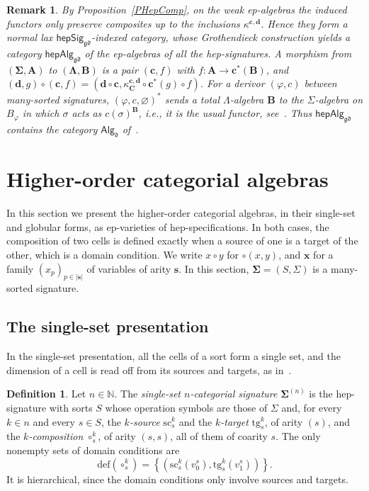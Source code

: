 \documentclass[a4paper,reqno]{amsart}
\newcommand{\bb}[1]{\lvert #1 \rvert}           %
\newcommand{\sig}[1]{\mathbf{#1}}                %
\newcommand{\gd}{\mathfrak{gd}}
\newcommand{\src}{\mathrm{sc}}
\newcommand{\tgt}{\mathrm{tg}}
\newcommand{\mor}{\to}
\newcommand{\defi}{\mathrm{def}}
\theoremstyle{plain}
\newtheorem{remark}[theorem]{Remark}
\theoremstyle{definition}
\newtheorem{definition}[theorem]{Definition}
\begin{document}
\begin{remark}\label{RHepAlgCat}
By Proposition~\ref{PHepComp}, on the weak ep-algebras the induced functors only preserve composites up to the inclusions $\kappa^{\mathbf{c},\mathbf{d}}$.
Hence they form a normal lax $\mathsf{hepSig}_{\gd}$-indexed category, whose Grothendieck construction yields a category $\mathsf{hepAlg}_{\gd}$ of the ep-algebras of all the hep-signatures.
A morphism from $(\sig{\Sigma},\mathbf{A})$ to $(\sig{\Lambda},\mathbf{B})$ is a pair $(\mathbf{c},f)$ with $f\colon\mathbf{A}\mor\mathbf{c}^{\ast}(\mathbf{B})$, and $(\mathbf{d},g)\circ(\mathbf{c},f)=(\mathbf{d}\circ\mathbf{c},\kappa^{\mathbf{c},\mathbf{d}}_{\mathbf{C}}\circ\mathbf{c}^{\ast}(g)\circ f)$.
For a derivor $(\varphi,c)$ between many-sorted signatures, $(\varphi,c,\varnothing)^{\ast}$ sends a total $\Lambda$-algebra $\mathbf{B}$ to the $\Sigma$-algebra on $B_{\varphi}$ in which $\sigma$ acts as $c(\sigma)^{\mathbf{B}}$, i.e., it is the usual functor, see~\cite{CVST10b}.
Thus $\mathsf{hepAlg}_{\gd}$ contains the category $\mathsf{Alg}_{\mathfrak{d}}$ of~\cite{CVST10b}.
\end{remark}

\section{Higher-order categorial algebras}\label{SCatAlg}

In this section we present the higher-order categorial algebras, in their single-set and globular forms, as ep-varieties of hep-specifications.
In both cases, the composition of two cells is defined exactly when a source of one is a target of the other, which is a domain condition.
We write $x\circ y$ for $\circ(x,y)$, and $\mathbf{x}$ for a family $(x_{p})_{p\in\bb{\mathbf{s}}}$ of variables of arity $\mathbf{s}$.
In this section, $\sig{\Sigma}=(S,\Sigma)$ is a many-sorted signature.

\subsection{The single-set presentation}

In the single-set presentation, all the cells of a sort form a single set, and the dimension of a cell is read off from its sources and targets, as in~\cite{Str87}.

\begin{definition}\label{DSigmaCatSingleSet}
Let $n\in\mathbb{N}$.
The \emph{single-set $n$-categorial signature} $\sig{\Sigma}^{(n)}$ is the hep-signature with sorts $S$ whose operation symbols are those of $\Sigma$ and, for every $k\in n$ and every $s\in S$, the \emph{$k$-source} $\src^{k}_{s}$ and the \emph{$k$-target} $\tgt^{k}_{s}$, of arity $(s)$, and the \emph{$k$-composition} $\circ^{k}_{s}$, of arity $(s,s)$, all of them of coarity $s$.
The only nonempty sets of domain conditions are
$$
\defi(\circ^{k}_{s})=\left\{\left(\src^{k}_{s}(v^{s}_{0}),\tgt^{k}_{s}(v^{s}_{1})\right)\right\}.
$$
It is hierarchical, since the domain conditions only involve sources and targets.
\end{definition}
\end{document}
